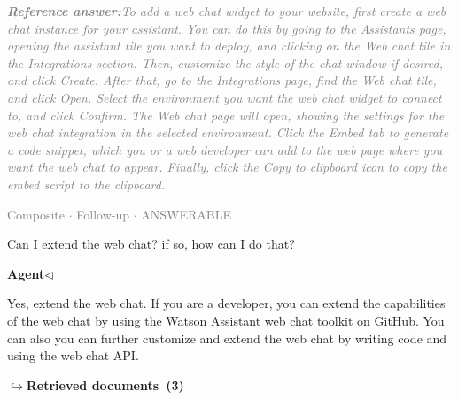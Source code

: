 \documentclass[a4paper,11pt]{article}
\begin{document}
\begin{refanswerenv}
{\footnotesize\textit{\textcolor{gray}{\textbf{Reference answer:}\enspace To add a web chat widget to your website, first create a web chat instance for your assistant. You can do this by going to the Assistants page, opening the assistant tile you want to deploy, and clicking on the Web chat tile in the Integrations section. Then, customize the style of the chat window if desired, and click Create. After that, go to the Integrations page, find the Web chat tile, and click Open. Select the environment you want the web chat widget to connect to, and click Confirm. The Web chat page will open, showing the settings for the web chat integration in the selected environment. Click the Embed tab to generate a code snippet, which you or a web developer can add to the web page where you want the web chat to appear. Finally, click the Copy to clipboard icon to copy the embed script to the clipboard.}}}
\end{refanswerenv}
\vspace{0.5em}
\hfill{\tiny\textcolor{gray}{Composite $\cdot$ Follow-up $\cdot$ ANSWERABLE}}
\begin{userbubble}
Can I extend the web chat? if so, how can I do that?
\end{userbubble}
\noindent\hfill{\small\textcolor{agentcolor}{\textbf{Agent\enspace$\triangleleft$}}}
\begin{agentbubble}
Yes, extend the web chat. If you are a developer, you can extend the capabilities of the web chat by using the Watson Assistant web chat toolkit on GitHub. You can also you can further customize and extend the web chat by writing code and using the web chat API.
\end{agentbubble}
\noindent\hfill{\footnotesize\textcolor{doccolor}{\textbf{$\hookrightarrow$\enspace Retrieved documents~(3)}}}
\end{document}
